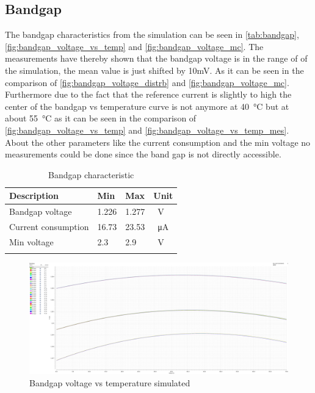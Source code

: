 \subsection{Bandgap}
\label{subsubsec:bandgap}
The bandgap characteristics from the simulation can be seen in \autoref{tab:bandgap}, \autoref{fig:bandgap_voltage_vs_temp} and \autoref{fig:bandgap_voltage_mc}. The measurements have thereby shown that the bandgap voltage is in the range of of the simulation, the mean value is just shifted by 10mV. As it can be seen in the comparison of \autoref{fig:bandgap_voltage_distrb} and \autoref{fig:bandgap_voltage_mc}. Furthermore due to the fact that the reference current is slightly to high the center of the bandgap vs temperature curve is not anymore at \qty{40}{\degreeCelsius} but at about \qty{55}{\degreeCelsius} as it can be seen in the comparison of \autoref{fig:bandgap_voltage_vs_temp} and \autoref{fig:bandgap_voltage_vs_temp_mes}. About the other parameters like the current consumption and the min voltage no measurements could be done since the band gap is not directly accessible.
\begin{longtable}{|p{3.5cm}|p{3.5cm}|p{3.5cm}|p{3.5cm}|}
	\hline
	\rowcolor{lightgray}
	\textbf{Description} &\textbf{Min} &\textbf{Max} & \textbf{Unit} \\ \hline
	
	Bandgap voltage & 1.226 & 1.277 &\qty{}{\volt} \\ \hline
	Current consumption & 16.73 & 23.53 & \qty{}{\micro\ampere} \\ \hline
	Min voltage & 2.3& 2.9 & \qty{}{\volt} \\ \hline
	\caption{Bandgap characteristic} %
	\label{tab:bandgap}
\end{longtable}
\begin{figure}[ht]
	\centering
	\includegraphics[width=\textwidth]{images/05_bandgap/band_volt.pdf}
	\caption{Bandgap voltage vs temperature simulated}
	\label{fig:bandgap_voltage_vs_temp}
\end{figure}
